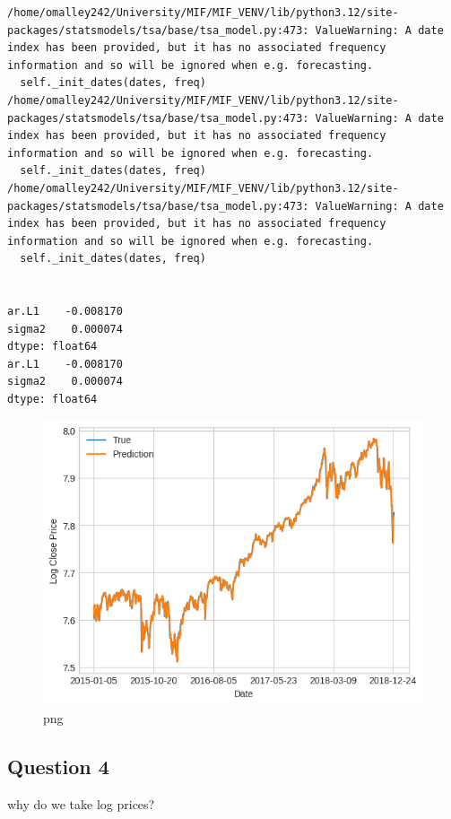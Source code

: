 \begin{lstlisting}
/home/omalley242/University/MIF/MIF_VENV/lib/python3.12/site-packages/statsmodels/tsa/base/tsa_model.py:473: ValueWarning: A date index has been provided, but it has no associated frequency information and so will be ignored when e.g. forecasting.
  self._init_dates(dates, freq)
/home/omalley242/University/MIF/MIF_VENV/lib/python3.12/site-packages/statsmodels/tsa/base/tsa_model.py:473: ValueWarning: A date index has been provided, but it has no associated frequency information and so will be ignored when e.g. forecasting.
  self._init_dates(dates, freq)
/home/omalley242/University/MIF/MIF_VENV/lib/python3.12/site-packages/statsmodels/tsa/base/tsa_model.py:473: ValueWarning: A date index has been provided, but it has no associated frequency information and so will be ignored when e.g. forecasting.
  self._init_dates(dates, freq)


ar.L1    -0.008170
sigma2    0.000074
dtype: float64
ar.L1    -0.008170
sigma2    0.000074
dtype: float64
\end{lstlisting}

\begin{figure}
\centering
\includegraphics{ARMAvsARIMA_files/ARMAvsARIMA_9_2.png}
\caption{png}
\end{figure}

\hypertarget{question-4}{%
\subsection{Question 4}\label{question-4}}

why do we take log prices?
